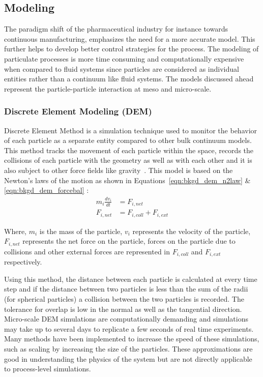 \documentclass[preprint,11pt,authoryear]{elsarticle}
\begin{document}
\subsection{Modeling}
The paradigm shift of the pharmaceutical industry for instance towards continuous manufacturing, 
emphasizes the need for a more accurate model. This further helps to develop better control strategies 
for the process. The modeling of particulate processes is more time consuming and computationally 
expensive when compared to fluid systems since particles are considered as individual entities 
rather than a continuum like fluid systems. The models discussed ahead represent the 
particle-particle interaction at meso and micro-scale.
\subsubsection{Discrete Element Modeling (DEM)}
 Discrete Element Method is a simulation technique used to monitor the behavior of each particle 
as a separate entity compared to other bulk continuum models. This method tracks the movement of 
each particle within the space, records the collisions of each particle with the geometry as well 
as with each other and it is also subject to other force fields like gravity~\citep{Barrasso2015cerd}. This 
model is based on the Newton's laws of the motion as shown in Equations~\ref{eqn:bkgd_dem_n2law} \& \ref{eqn:bkgd_dem_forcebal} : \\
\begin{align}
m_i\frac{dv_i}{dt} &= F_{i,net} \label{eqn:bkgd_dem_n2law} \\
F_{i,net} &=  F_{i,coll} +  F_{i,ext} \label{eqn:bkgd_dem_forcebal}
\end{align}

Where, $m_i$ is the mass of the particle, $v_i$ represents the velocity of 
the particle, $F_{i,net}$  represents the net force on the particle, forces on the particle due to collisions 
and other external forces are represented in $F_{i,coll}$ and $F_{i,ext}$ respectively.

Using this method, the distance between each particle is calculated at every time step and if the distance between two 
particles is less than the sum of the radii (for spherical particles)  a collision between the two particles 
is recorded. The tolerance for overlap is low in the normal as well as the tangential direction. 
Micro-scale DEM simulations are computationally demanding and simulations may take up to several 
days to replicate a few seconds of real time experiments. Many methods have been implemented to 
increase the speed of these simulations, such as scaling by increasing the size of the particles. These 
approximations are good in understanding the physics of the system but are not directly applicable to 
process-level simulations. 
\end{document}
